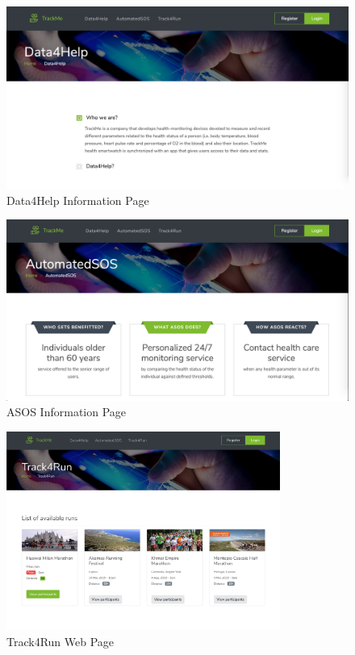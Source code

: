 \documentclass[a4paper, hidelinks, 12pt]{report}
\begin{document}
	\begin{figure}[H]
		\centering
		\includegraphics[scale=0.3]{UI/d4h.png}

		\caption[UI: Data4Help Information Page]{Data4Help Information Page}
		\label{fig:Data4Help Information Page}
	\end{figure}
	\begin{figure}[H]
		\centering
		\includegraphics[scale=0.3]{UI/asos.png}

		\caption[UI: ASOS Information Page]{ASOS Information Page}
		\label{fig:ASOS Information Page}
	\end{figure}
	
	\begin{figure}[H]
		\centering
		\includegraphics[width=0.8\textwidth]{UI/t4r.png}
		\caption[UI: Track4Run Web Page]{Track4Run Web Page}
		\label{fig:Track4Run Web Page}
	\end{figure}
	
\end{document}
